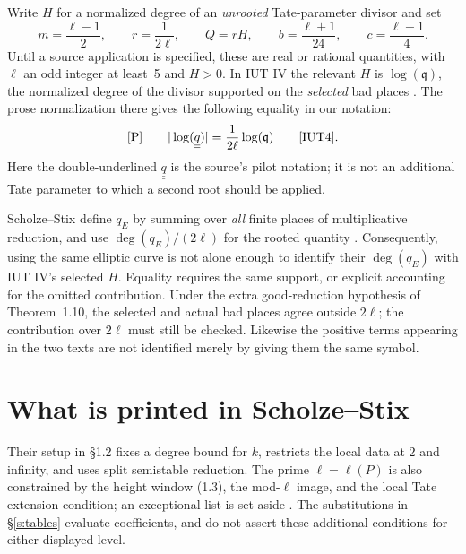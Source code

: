 \documentclass[11pt]{article}
\theoremstyle{remark}
\newcommand{\qpilot}{\underline{\underline{q}}}
\newcommand{\Pmark}{\textup{[P]}}
\begin{document}
Write $H$ for a normalized degree of an \emph{unrooted} Tate-parameter
divisor and set
\begin{equation}\label{e:constants}
 m=\frac{\ell-1}{2},\qquad r=\frac1{2\ell},\qquad
 Q=rH,\qquad b=\frac{\ell+1}{24},\qquad c=\frac{\ell+1}{4}.
\end{equation}
Until a source application is specified, these are real or rational
quantities, with $\ell$ an odd integer at least~5 and $H>0$.
In IUT IV the relevant $H$ is $\log(\mathfrak q)$, the normalized degree
of the divisor supported on the \emph{selected} bad places
\cite[Thm.~1.10, pp.~22--23]{IUT4}.  The prose normalization there gives the following equality in our notation:
\begin{equation}\label{e:root}
 \Pmark\qquad |\log(\qpilot)|=\frac1{2\ell}\log(\mathfrak q)
 \qquad\text{\cite[Thm.~1.10, p.~23]{IUT4}}.
\end{equation}
Here the double-underlined $\qpilot$ is the source's pilot notation;
it is not an additional Tate parameter to which a second root should be applied.

Scholze--Stix define $q_E$ by summing over \emph{all} finite places of
multiplicative reduction, and use $\deg(q_E)/(2\ell)$ for the rooted
quantity \cite[\S1.2, p.~2; \S1.3, pp.~3--4]{SS}.
Consequently, using the same elliptic curve is not alone enough to identify
their $\deg(q_E)$ with IUT IV's selected $H$.
Equality requires the same support, or explicit accounting for the omitted
contribution.  Under the extra good-reduction hypothesis of Theorem~1.10,
the selected and actual bad places agree outside $2\ell$; the contribution
over $2\ell$ must still be checked.  Likewise the positive terms appearing
in the two texts are not identified merely by giving them the same symbol.

\section{What is printed in Scholze--Stix}\label{s:ss}

Their setup in \S1.2 fixes a degree bound for $k$, restricts the local data
at $2$ and infinity, and uses split semistable reduction.  The prime
$\ell=\ell(P)$ is also constrained by the height window (1.3), the
mod-$\ell$ image, and the local Tate extension condition; an exceptional
list is set aside \cite[\S1.2, pp.~2--3]{SS}.
The substitutions in \S\ref{s:tables} evaluate coefficients, and do not
assert these additional conditions for either displayed level.
\end{document}
